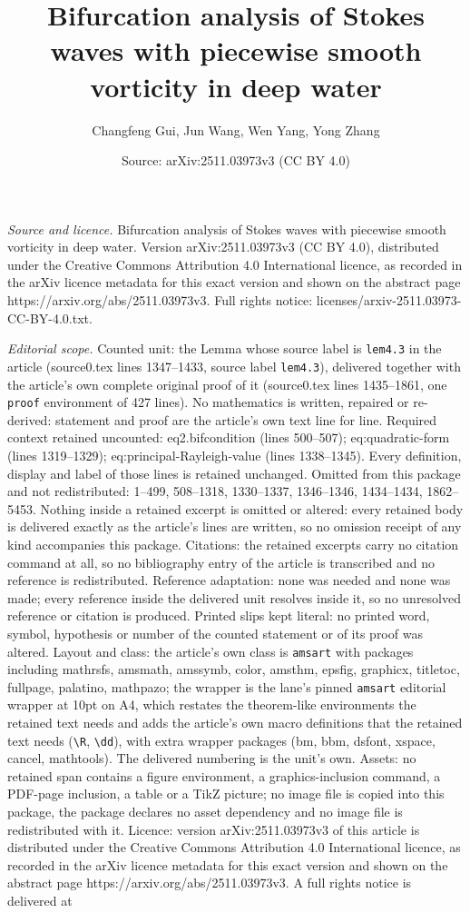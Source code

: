 \documentclass[10pt,a4paper]{amsart}
\title[Bifurcation analysis of Stokes waves with piecewise smooth v]{Bifurcation analysis of Stokes waves with piecewise smooth vorticity in deep water}
\author{Changfeng Gui, Jun Wang, Wen Yang, Yong Zhang}
\date{Source: arXiv:2511.03973v3 (CC BY 4.0)}
\begin{document}
\maketitle

\noindent\emph{Source and licence.} Bifurcation analysis of Stokes waves with piecewise smooth vorticity in deep water. Version arXiv:2511.03973v3 (CC BY 4.0), distributed under the Creative Commons Attribution 4.0 International licence, as recorded in the arXiv licence metadata for this exact version and shown on the abstract page https://arxiv.org/abs/2511.03973v3. Full rights notice: licenses/arxiv-2511.03973-CC-BY-4.0.txt.\par\smallskip

\noindent\textit{Editorial scope.} Counted unit: the Lemma whose source label is \texttt{lem4.3} in the article (source0.tex lines 1347--1433, source label \texttt{lem4.3}), delivered together with the article's own complete original proof of it (source0.tex lines 1435--1861, one \texttt{proof} environment of 427 lines). No mathematics is written, repaired or re-derived: statement and proof are the article's own text line for line. Required context retained uncounted: eq2.bifcondition (lines 500--507); eq:quadratic-form (lines 1319--1329); eq:principal-Rayleigh-value (lines 1338--1345). Every definition, display and label of those lines is retained unchanged. Omitted from this package and not redistributed: 1--499, 508--1318, 1330--1337, 1346--1346, 1434--1434, 1862--5453. Nothing inside a retained excerpt is omitted or altered: every retained body is delivered exactly as the article's lines are written, so no omission receipt of any kind accompanies this package. Citations: the retained excerpts carry no citation command at all, so no bibliography entry of the article is transcribed and no reference is redistributed. Reference adaptation: none was needed and none was made; every reference inside the delivered unit resolves inside it, so no unresolved reference or citation is produced. Printed slips kept literal: no printed word, symbol, hypothesis or number of the counted statement or of its proof was altered. Layout and class: the article's own class is \texttt{amsart} with packages including mathrsfs, amsmath, amssymb, color, amsthm, epsfig, graphicx, titletoc, fullpage, palatino, mathpazo; the wrapper is the lane's pinned \texttt{amsart} editorial wrapper at 10pt on A4, which restates the theorem-like environments the retained text needs and adds the article's own macro definitions that the retained text needs (\texttt{\textbackslash R}, \texttt{\textbackslash dd}), with extra wrapper packages (bm, bbm, dsfont, xspace, cancel, mathtools). The delivered numbering is the unit's own. Assets: no retained span contains a figure environment, a graphics-inclusion command, a PDF-page inclusion, a table or a TikZ picture; no image file is copied into this package, the package declares no asset dependency and no image file is redistributed with it. Licence: version arXiv:2511.03973v3 of this article is distributed under the Creative Commons Attribution 4.0 International licence, as recorded in the arXiv licence metadata for this exact version and shown on the abstract page https://arxiv.org/abs/2511.03973v3. A full rights notice is delivered at 
\end{document}

